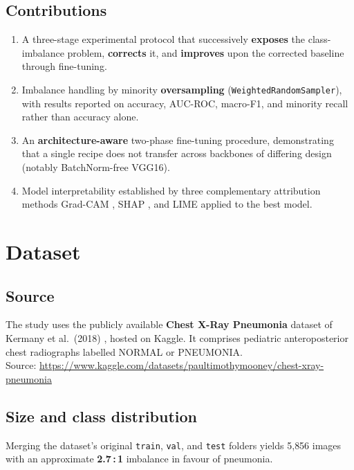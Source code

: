 \documentclass[11pt,a4paper]{article}
\numberwithin{figure}{section}
\numberwithin{table}{section}
\let\oldsection\section
\renewcommand{\section}{\clearpage\oldsection}
\begin{document}
\subsection{Contributions}
\begin{enumerate}
\item A three-stage experimental protocol that successively \textbf{exposes} the class-imbalance
problem, \textbf{corrects} it, and \textbf{improves} upon the corrected baseline through fine-tuning.
\item Imbalance handling by minority \textbf{oversampling} (\texttt{WeightedRandomSampler}), with results
reported on accuracy, AUC-ROC, macro-F1, and minority recall rather than accuracy alone.
\item An \textbf{architecture-aware} two-phase fine-tuning procedure, demonstrating that a single recipe
does not transfer across backbones of differing design (notably BatchNorm-free VGG16).
\item Model interpretability established by three complementary attribution methods Grad-CAM
\cite{gradcam}, SHAP \cite{shap}, and LIME \cite{lime} applied to the best model.
\end{enumerate}

\section{Dataset}

\subsection{Source}
The study uses the publicly available \textbf{Chest X-Ray Pneumonia} dataset of Kermany et al.\ (2018)
\cite{kermany}, hosted on Kaggle. It comprises pediatric anteroposterior chest radiographs labelled
NORMAL or PNEUMONIA.\\
Source: \url{https://www.kaggle.com/datasets/paultimothymooney/chest-xray-pneumonia}\\

\subsection{Size and class distribution}
Merging the dataset's original \texttt{train}, \texttt{val}, and \texttt{test} folders yields 5{,}856
images with an approximate \textbf{2.7\,:\,1} imbalance in favour of pneumonia.
\end{document}
